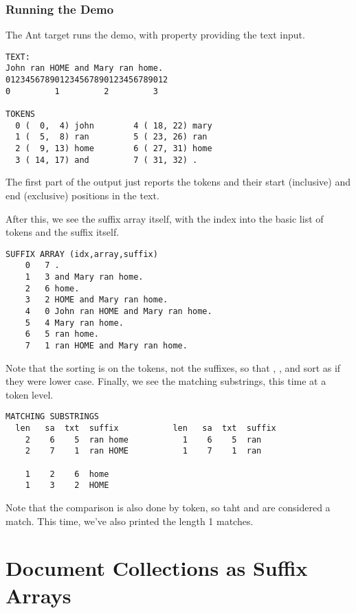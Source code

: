 \subsubsection{Running the Demo}

The Ant target  runs the demo, with property
 providing the text input.

\begin{verbatim}
TEXT:
John ran HOME and Mary ran home.
012345678901234567890123456789012
0         1         2         3

TOKENS
  0 (  0,  4) john        4 ( 18, 22) mary
  1 (  5,  8) ran         5 ( 23, 26) ran
  2 (  9, 13) home        6 ( 27, 31) home
  3 ( 14, 17) and         7 ( 31, 32) .
\end{verbatim}
%
The first part of the output just reports the tokens
and their start (inclusive) and end (exclusive) positions 
in the text.  

After this, we see the suffix array itself, with the
index into the basic list of tokens and the suffix itself.
%
\begin{verbatim}
SUFFIX ARRAY (idx,array,suffix)
    0   7 .
    1   3 and Mary ran home.
    2   6 home.
    3   2 HOME and Mary ran home.
    4   0 John ran HOME and Mary ran home.
    5   4 Mary ran home.
    6   5 ran home.
    7   1 ran HOME and Mary ran home.
\end{verbatim}
%
Note that the sorting is on the tokens, not the suffixes,
so that , , and
 sort as if they were lower case.  Finally,
we see the matching substrings, this time at a token level.
%
\begin{verbatim}
MATCHING SUBSTRINGS
  len   sa  txt  suffix           len   sa  txt  suffix
    2    6    5  ran home           1    6    5  ran
    2    7    1  ran HOME           1    7    1  ran

    1    2    6  home
    1    3    2  HOME
\end{verbatim}
%
Note that the comparison is also done by token, so taht
 and  are considered a
match.  This time, we've also printed the length 1 matches.


\section{Document Collections as Suffix Arrays}%
\label{section:suffix-arrays-doc-sa}

